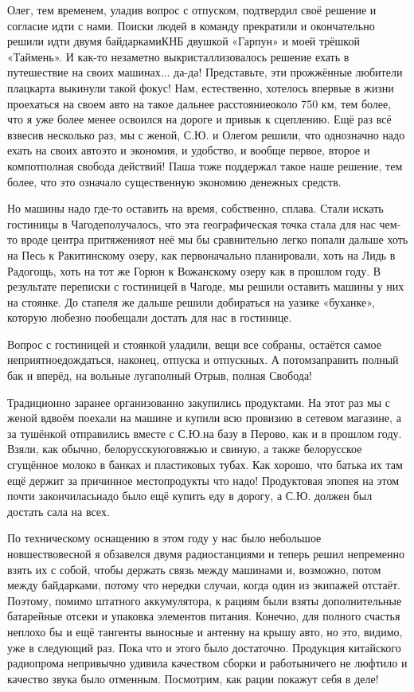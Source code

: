 Олег, тем временем, уладив вопрос с отпуском, подтвердил своё решение и согласие идти с нами. Поиски людей в команду прекратили и окончательно решили идти двумя байдарками\mdash КНБ двушкой «Гарпун» и моей трёшкой «Таймень». И как-то незаметно выкристаллизовалось решение ехать в путешествие на своих машинах$\ldots$ да-да! Представьте, эти прожжённые любители плацкарта выкинули такой фокус! Нам, естественно, хотелось впервые в жизни проехаться на своем авто на такое дальнее расстояние\mdash около 750 км, тем более, что я уже более менее освоился на дороге и привык к сцеплению. Ещё раз всё взвесив несколько раз, мы с женой, С.Ю. и Олегом решили, что однозначно надо ехать на своих авто\mdash это и экономия, и удобство, и вообще первое, второе и компот\mdash полная свобода действий! Паша тоже поддержал такое наше решение, тем более, что это означало существенную экономию денежных средств. 

Но машины надо где-то оставить на время, собственно, сплава. Стали искать гостиницы в Чагоде\mdash получалось, что эта географическая точка стала для нас чем-то вроде центра притяжения\mdash от неё мы бы сравнительно легко попали дальше хоть на Песь к Ракитинскому озеру, как первоначально планировали, хоть на Лидь в Радогощь, хоть на тот же Горюн к Вожанскому озеру как в прошлом году. В результате переписки с гостиницей в Чагоде, мы решили оставить машины у них на стоянке. До стапеля же дальше решили добираться на уазике «буханке», которую любезно пообещали достать для нас в гостинице. 

Вопрос с гостиницей и стоянкой уладили, вещи все собраны, остаётся самое неприятное\mdash дождаться, наконец, отпуска и отпускных. А потом\mdash заправить полный бак и вперёд, на вольные луга\mdash полный Отрыв, полная Свобода! 

Традиционно заранее организованно закупились продуктами. На этот раз мы с женой вдвоём поехали на машине и купили всю провизию в сетевом магазине, а за тушёнкой отправились вместе с С.Ю.\mdash на базу в Перово, как и в прошлом году. Взяли, как обычно, белорусскую\mdash говяжью и свиную, а также белорусское сгущённое молоко в банках и пластиковых тубах. Как хорошо, что батька их там ещё держит за причинное место\mdash продукты что надо! Продуктовая эпопея на этом почти закончилась\mdash надо было ещё купить еду в дорогу, а С.Ю. должен был достать сала на всех.

По техническому оснащению в этом году у нас было небольшое новшество\mdash весной я обзавелся двумя радиостанциями и теперь решил непременно взять их с собой, чтобы держать связь между машинами и, возможно, потом между байдарками, потому что нередки случаи, когда один из экипажей отстаёт. Поэтому, помимо штатного аккумулятора, к рациям были взяты дополнительные батарейные отсеки и упаковка элементов питания. Конечно, для полного счастья неплохо бы и ещё тангенты выносные и антенну на крышу авто, но это, видимо, уже в следующий раз. Пока что и этого было достаточно. Продукция китайского радиопрома непривычно удивила качеством сборки и работы\mdash ничего не люфтило и качество звука было отменным. Посмотрим, как рации покажут себя в деле!

